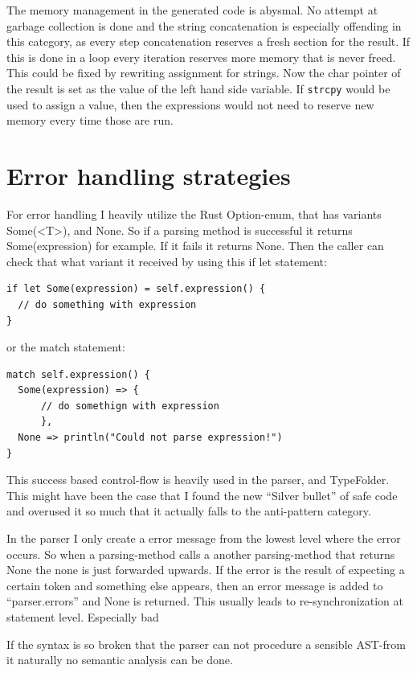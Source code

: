 \documentclass[12pt,a4paper]{article}
\begin{document}
The memory management in the generated code is abysmal. No attempt at garbage
collection is done and the string concatenation is especially offending in this
category, as every step concatenation reserves a fresh section for the result.
If this is done in a loop every iteration reserves more memory that is 
never freed. This could be fixed by rewriting assignment for strings.
Now the char pointer of the result is set as the value of the left hand
side variable. If \texttt{strcpy} would be used to assign a value, then
the expressions would not need to reserve new memory every time those are run.


\section{Error handling strategies}

For error handling I heavily utilize the Rust Option-enum, that
has variants Some(<T>), and None. So if a parsing method
is successful it returns Some(expression) for example.
If it fails it returns None. Then the caller can check that
what variant it received by using this if let statement: 
\begin{verbatim}
if let Some(expression) = self.expression() {
  // do something with expression
}
\end{verbatim}
or the match statement:
\begin{verbatim}
match self.expression() {
  Some(expression) => {
      // do somethign with expression
      },
  None => println("Could not parse expression!")
}
\end{verbatim}

This success based control-flow is heavily used in the parser, and TypeFolder.
This might have been the case that I found the new ``Silver bullet'' of safe code
and overused it so much that it actually falls to the anti-pattern category.

In the parser I only create a error message from the lowest level where the
error occurs.  So when a parsing-method calls a another parsing-method that
returns None the none is just forwarded upwards. If the error is the result
of expecting a certain token and something else appears, then an error message
is added to ``parser.errors'' and None is returned. This usually
leads to re-synchronization at statement level. Especially bad 

If the syntax is so broken that the parser can not procedure a sensible
AST-from it naturally no semantic analysis can be done.
\end{document}
